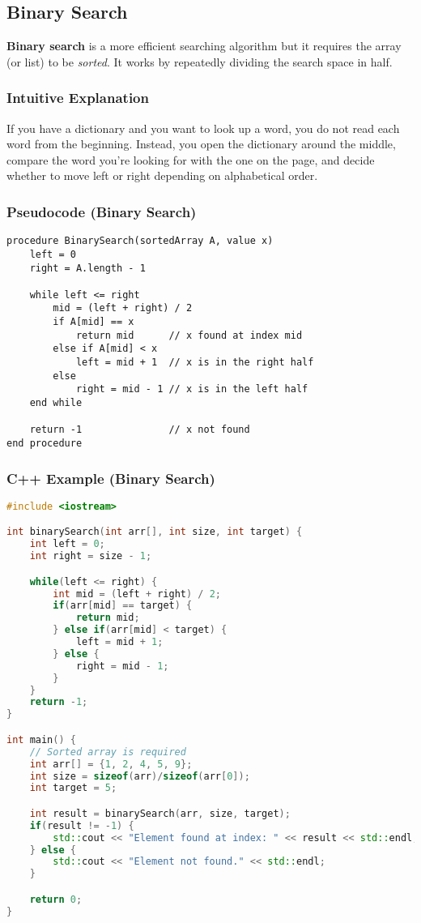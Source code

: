 \documentclass[a4paper,12pt]{article}
\begin{document}
\subsection{Binary Search}
\textbf{Binary search} is a more efficient searching algorithm but it requires the array (or list) to be \emph{sorted}. It works by repeatedly dividing the search space in half.

\subsubsection*{Intuitive Explanation}
If you have a dictionary and you want to look up a word, you do not read each word from the beginning. Instead, you open the dictionary around the middle, compare the word you're looking for with the one on the page, and decide whether to move left or right depending on alphabetical order.

\subsubsection*{Pseudocode (Binary Search)}
\begin{verbatim}
procedure BinarySearch(sortedArray A, value x)
    left = 0
    right = A.length - 1

    while left <= right
        mid = (left + right) / 2
        if A[mid] == x
            return mid      // x found at index mid
        else if A[mid] < x
            left = mid + 1  // x is in the right half
        else
            right = mid - 1 // x is in the left half
    end while

    return -1               // x not found
end procedure
\end{verbatim}

\subsubsection*{C++ Example (Binary Search)}
\begin{lstlisting}[language=C++]
#include <iostream>

int binarySearch(int arr[], int size, int target) {
    int left = 0;
    int right = size - 1;

    while(left <= right) {
        int mid = (left + right) / 2;
        if(arr[mid] == target) {
            return mid;
        } else if(arr[mid] < target) {
            left = mid + 1;
        } else {
            right = mid - 1;
        }
    }
    return -1;
}

int main() {
    // Sorted array is required
    int arr[] = {1, 2, 4, 5, 9};
    int size = sizeof(arr)/sizeof(arr[0]);
    int target = 5;

    int result = binarySearch(arr, size, target);
    if(result != -1) {
        std::cout << "Element found at index: " << result << std::endl;
    } else {
        std::cout << "Element not found." << std::endl;
    }

    return 0;
}
\end{lstlisting}
\end{document}
